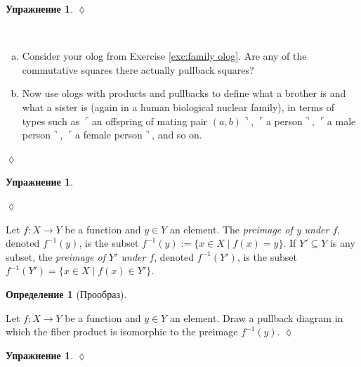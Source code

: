 \documentclass[a4paper]{book}
\def\tn{\textnormal}
\def\to{\rightarrow}
\def\taking{\colon}
\def\ss{\subseteq}
\def\|{{\;|\;}}
\def\m1{{-1}}
\newcommand{\fakebox}[1]{\tn{$\ulcorner$#1$\urcorner$}}
\theoremstyle{myth}
\newtheorem{excENG}[envENG]{\begin{english}Exercise\end{english}}
\newtheorem{definitionENG}[envENG]{\begin{english}Definition\end{english}}
\newenvironment{exerciseENG}{\begin{excENG}}{\hspace*{\fill}$\lozenge$\end{excENG}}
\newtheorem{excRUS}[envRUS]{Упражнение}
\newtheorem{definitionRUS}[envRUS]{Определение}
\newenvironment{exerciseRUS}{\begin{excRUS}}{\hspace*{\fill}$\lozenge$\end{excRUS}}
\def\sexc{\begin{enumerate}[a.)]\setlength{\itemsep}{.1cm}\setlength{\parskip}{.1cm}\item}
\def\next{\item}
\def\endsexc{\end{enumerate}}
\begin{document}
\begin{russian}
\begin{exerciseRUS}
 
\end{exerciseRUS}

\begin{exerciseENG}~
\sexc Consider your olog from Exercise \ref{exc:family olog}. Are any of the commutative squares there actually pullback squares? 
\next Now use ologs with products and pullbacks to define what a brother is and what a sister is (again in a human biological nuclear family), in terms of types such as \fakebox{an offspring of mating pair $(a,b)$}, \fakebox{a person}, \fakebox{a male person}, \fakebox{a female person}, and so on.
\endsexc
\end{exerciseENG}

\begin{exerciseRUS}~
 
\end{exerciseRUS}

\begin{definitionENG}[Preimage]\label{def:preimage}
Let $f\taking X\to Y$ be a function and $y\in Y$ an element. The {\em preimage of y under $f$}, denoted $f^\m1(y)$,\index{a symbol!$f^\m1$} is  the subset $f^\m1(y):=\{x\in X\|f(x)=y\}$. If $Y'\ss Y$ is any subset, the {\em preimage of $Y'$ under $f$}, denoted $f^\m1(Y')$, is the subset $f^\m1(Y')=\{x\in X\|f(x)\in Y'\}$.
\end{definitionENG}

\begin{definitionRUS}[Прообраз]\label{def:preimage}
 
\end{definitionRUS}

\begin{exerciseENG}
Let $f\taking X\to Y$ be a function and $y\in Y$ an element. Draw a pullback diagram in which the fiber product is isomorphic to the preimage $f^\m1(y)$.
\end{exerciseENG}

\begin{exerciseRUS}
 
\end{exerciseRUS}


\end{russian}
\end{document}
